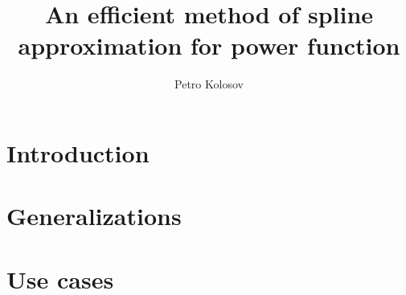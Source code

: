 \documentclass[12pt,letterpaper,oneside,reqno]{amsart}
\title[An efficient method of spline approximation for power function]
{An efficient method of spline approximation for power function}
\author[Petro Kolosov]{Petro Kolosov}
\begin{document}
    \maketitle

%        




    \section{Introduction} \label{sec:introduction}
    


    \section{Generalizations}\label{sec:generalizations}
    


    \section{Use cases}\label{sec:use-cases}
    


%    

    
    
\end{document}
